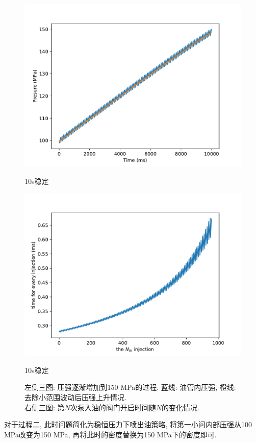 \documentclass{cumcmthesis}
\begin{document}
\begin{figure}[htbp]
\begin{minipage}[t]{0.48\textwidth}
        \includegraphics[scale=0.45]{10000.pdf}
        \caption{10s稳定}
        \label{10000}
    \end{minipage}
    \begin{minipage}[t]{0.48\textwidth}
        \centering
        \includegraphics[scale=0.45]{10000t.pdf}
        \caption{10s稳定}
        \label{10000t}
    \end{minipage}
    \caption{左侧三图: 压强逐渐增加到150 MPa的过程. 蓝线: 油管内压强, 橙线: 去除小范围波动后压强上升情况. \\右侧三图: 第$N$次泵入油的阀门开启时间随$N$的变化情况. }
    \label{numbert}
\end{figure}

对于过程二, 此时问题简化为稳恒压力下喷出油策略, 将第一小问内部压强从100 MPa改变为150 MPa, 再将此时的密度替换为150 MPa下的密度即可. 
\end{document}
